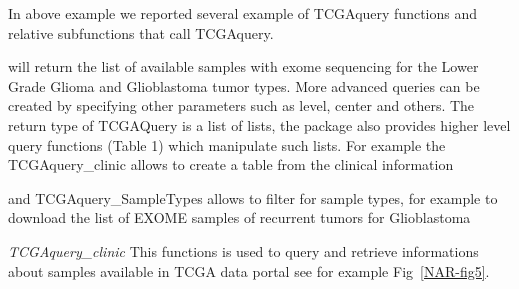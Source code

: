 In above example we reported several example of TCGAquery functions and relative subfunctions that call TCGAquery.

will return the list of available samples with exome sequencing for the Lower Grade Glioma and Glioblastoma tumor types.
More advanced queries can be created by specifying other parameters such as level, center and others.
The return type of TCGAQuery is a list of lists, the package also provides higher level query functions (Table 1) 
which manipulate such lists. For example the TCGAquery\_clinic allows to create a table from the clinical information 



and TCGAquery\_SampleTypes allows to filter for sample types, for example to download the list of EXOME samples of recurrent tumors for Glioblastoma








\textit{TCGAquery\_clinic} 
This functions is used to query and retrieve informations about samples available in TCGA data portal see for example Fig~\ref{NAR-fig5}.


